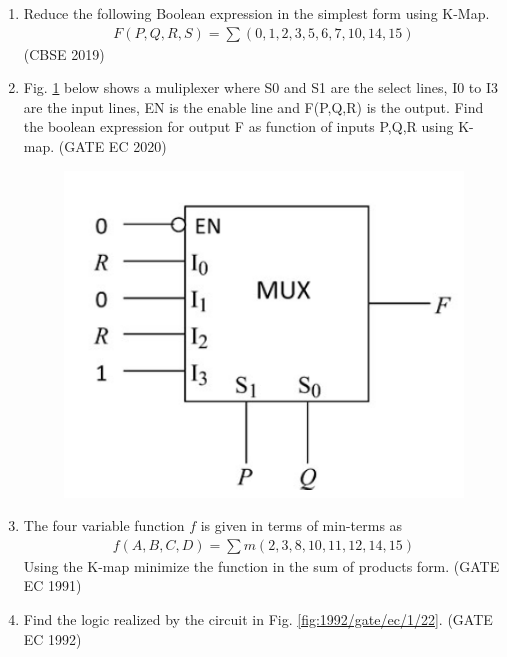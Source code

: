 \begin{enumerate}
\item 
	Reduce the following Boolean expression in the simplest form using K-Map.
		\begin{align}
F(P,Q,R,S) = \sum (0,1,2,3,5,6,7,10,14,15)
		\end{align}
\hfill (CBSE 2019)
\label{prob:2019/c/6/d}
%
\item Fig. \ref{fig:2020/gate/ec/10} below shows a muliplexer where S0 and S1 are the select lines, I0 to I3 are the input lines, EN is the enable line and F(P,Q,R) is the output. Find the boolean expression for output F as function of inputs P,Q,R using K-map. 
%
\label{prob:2020/gate/ec/10}
\hfill (GATE EC 2020)
\begin{figure}[ht]
\centering
	\includegraphics[width=1\columnwidth]{figs/2020-gate-ec-10.png}
\caption{}
\label{fig:2020/gate/ec/10}
\end{figure}
%
\item
	The four variable function $f$ is given in terms of min-terms as
		\begin{align}
	    f(A,B,C,D) = \sum m(2,3,8,10,11,12,14,15)
\label{eq:1991/gate/ec/9}
		\end{align}
	    Using the K-map minimize the function in the sum of products form. 
\label{prob:1991/gate/ec/9}
\hfill (GATE EC 1991)
\item Find the logic realized by the circuit in Fig. 
\ref{fig:1992/gate/ec/1/22}.
\label{prob:1992/gate/ec/1/22}
\hfill (GATE EC 1992)
\begin{figure}[ht]
\centering

\end{figure}
\end{enumerate}
